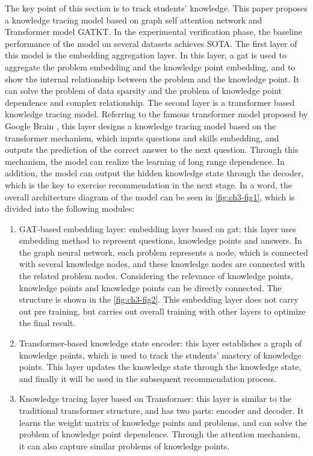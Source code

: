 The key point of this section is to track students' knowledge. This paper proposes a knowledge tracing model based on graph self attention network and Transformer model GATKT. In the experimental verification phase, the baseline performance of the model on several datasets achieves SOTA. The first layer of this model is the embedding aggregation layer. In this layer, a gat is used to aggregate the problem embedding and the knowledge point embedding, and to show the internal relationship between the problem and the knowledge point. It can solve the problem of data sparsity and the problem of knowledge point dependence and complex relationship. The second layer is a transformer based knowledge tracing model. Referring to the famous transformer model proposed by Google Brain \cite{vaswani2017attention}, this layer designs a knowledge tracing model based on the transformer mechanism, which inputs questions and skills embedding, and outputs the prediction of the correct answer to the next question. Through this mechanism, the model can realize the learning of long range dependence. In addition, the model can output the hidden knowledge state through the decoder, which is the key to exercise recommendation in the next stage. In a word, the overall architecture diagram of the model can be seen in \figurename{\ref{fig:ch3-fig1}}, which is divided into the following modules:
\begin{enumerate}
	\item GAT-based embedding layer: embedding layer based on gat: this layer uses embedding method to represent questions, knowledge points and answers. In the graph neural network, each problem represents a node, which is connected with several knowledge nodes, and these knowledge nodes are connected with the related problem nodes. Considering the relevance of knowledge points, knowledge points and knowledge points can be directly connected. The structure is shown in the \figurename{\ref{fig:ch3-fig2}}. This embedding layer does not carry out pre training, but carries out overall training with other layers to optimize the final result.
	\item Transformer-based knowledge state encoder: this layer establishes a graph of knowledge points, which is used to track the students' mastery of knowledge points. This layer updates the knowledge state through the knowledge state, and finally it will be used in the subsequent recommendation process.
	\item Knowledge tracing layer based on Transformer: this layer is similar to the traditional transformer structure, and has two parts: encoder and decoder. It learns the weight matrix of knowledge points and problems, and can solve the problem of knowledge point dependence. Through the attention mechanism, it can also capture similar problems of knowledge points.
\end{enumerate}

